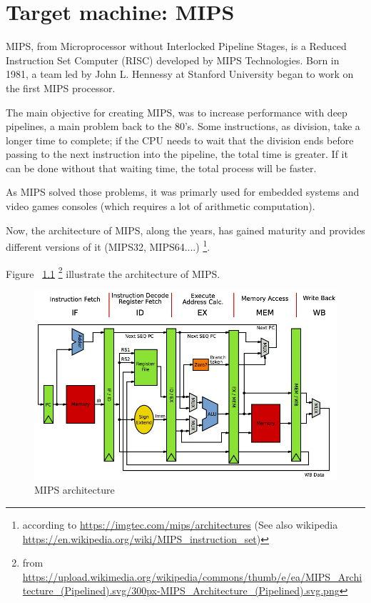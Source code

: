 \documentclass[
  oneside,
  11pt, a4paper,
  footinclude=true,
  headinclude=true,
  cleardoublepage=empty
]{scrbook}
\begin{document}
\chapter{Target machine: MIPS}


MIPS, from Microprocessor without Interlocked Pipeline Stages, is a Reduced Instruction Set Computer (RISC) developed by MIPS Technologies. 
Born in 1981, a team led by John L. Hennessy at Stanford University began to work on the first MIPS processor.

The main objective for creating MIPS, was to increase performance with deep pipelines, a main problem back to the 80's. 
Some instructions, as division, take a longer time to complete; if the CPU needs to wait that the division ends before passing to the next instruction into the pipeline, the total time is greater. If it can be done without that waiting time, the total process will be faster.

As MIPS solved those problems, it was primarly used for embedded systems and video games consoles (which requires a lot of arithmetic computation). 

Now, the architecture of MIPS, along the years, has gained maturity and provides different versions of it (MIPS32, MIPS64....) \footnote{according to \url{https://imgtec.com/mips/architectures} (See also wikipedia \url{https://en.wikipedia.org/wiki/MIPS_instruction_set})}.

Figure ~\ref{fig:MIPSarchitecture} \footnote{ from \url{https://upload.wikimedia.org/wikipedia/commons/thumb/e/ea/MIPS_Architecture_(Pipelined).svg/300px-MIPS_Architecture_(Pipelined).svg.png}}  illustrate the architecture of MIPS.


\begin{figure}[h!]
  \centering
    \includegraphics[width=1\textwidth]{img/MIPSarchitecture.png}
    \caption{MIPS architecture} %
    \label{fig:MIPSarchitecture}
\end{figure}
\end{document}
